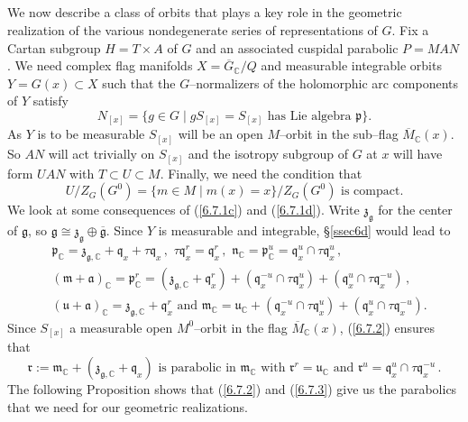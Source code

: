 \documentclass{conm-p-l}
\renewcommand{\gg}{\mathfrak{g}}
\newcommand{\gp}{\mathfrak{p}}
\newcommand{\gq}{\mathfrak{q}}
\def\ga{\mathfrak{a}}
\def\gg{\mathfrak{g}}
\def\gm{\mathfrak{m}}
\def\gn{\mathfrak{n}}
\def\gp{\mathfrak{p}}
\def\gq{\mathfrak{q}}
\def\gr{\mathfrak{r}}
\def\gu{\mathfrak{u}}
\def\gz{\mathfrak{z}}
\def\C{\mathbb{C}}
\begin{document}
\subsection{}\label{ssec6e}\setcounter{equation}{0}
We now describe a class of orbits that plays a key role in the geometric 
realization of the various nondegenerate series of representations of $G$.
Fix a Cartan subgroup $H = T\times A$ of $G$ and an associated cuspidal
parabolic $P=MAN$.  We need complex flag manifolds
$X = \overline{G}_\C/Q$ and measurable integrable orbits $Y = G(x) \subset X$
such that the $G$--normalizers of the holomorphic arc components of $Y$ satisfy
\begin{equation}\label{6.7.1c}
N_{[x]} = \{g \in G \mid gS_{[x]} = S_{[x]} \text{ has Lie algebra } \gp\}.
\end{equation}
As $Y$ is to be measurable $S_{[x]}$ will be an open $M$--orbit 
in the sub--flag $\overline{M}_\C(x)$.  So $AN$ will act trivially on $S_{[x]}$
and the isotropy subgroup of $G$ at $x$ will have form $UAN$ with
$T\subset U\subset M$.  Finally, we need the condition that
\begin{equation}\label{6.7.1d}
U/Z_G(G^0) = \{m \in M \mid m(x) = x\}/Z_G(G^0) \text{ is compact.}
\end{equation}  
We look at some consequences of (\ref{6.7.1c}) and (\ref{6.7.1d}).
Write $\gz_\gg$ for the center of $\gg$, so $\gg \cong \gz_\gg  \oplus
\overline{\gg}$.  Since $Y$ is measurable and integrable,
\S \ref{ssec6d} would lead to
\begin{equation}\label{6.7.2}
\begin{aligned}
&\gp_\C = \gz_{\gg,\C} + \gq_x + \tau\gq_x\,,\,\, \tau\gq_x^r = \gq_x^r\,,\,\,
	\gn_\C = \gp_\C^u = \gq_x^u\cap \tau\gq_x^u\,,\\
&(\gm+\ga)_\C = \gp_\C^r = (\gz_{\gg,\C} +\gq_x^r) 
		+ (\gq_x^{-u} \cap \tau\gq_x^u)
		+ (\gq_x^u \cap \tau\gq_x^{-u})\,, \\
& (\gu + \ga)_\C = \gz_{\gg,\C} + \gq_x^r \text{ and }
	\gm_\C = \gu_\C + (\gq_x^{-u} \cap \tau\gq_x^u)
                + (\gq_x^u \cap \tau\gq_x^{-u}).
\end{aligned}
\end{equation}
Since $S_{[x]}$ a measurable open $M^0$--orbit in the flag $\overline{M}_\C(x)$,
(\ref{6.7.2}) ensures that
\begin{equation}\label{6.7.3}
\gr:= \gm_\C + (\gz_{\gg,\C} + \gq_x) \text{ is parabolic in } \gm_\C 
	\text{ with } \gr^r = \gu_\C \text{ and } 
	\gr^u = \gq_x^u\cap \tau\gq_x^{-u}\,.
\end{equation}
The following Proposition shows that (\ref{6.7.2}) and (\ref{6.7.3}) give us
the parabolics that we need for our geometric realizations.
\end{document}
